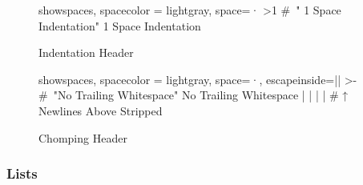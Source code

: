 \begin{figure}[H]
  \begin{minipage}[t]{0.48\textwidth}
    \vspace{0pt}
    \begin{bchart}[max=9, width=0.85\textwidth]
    \end{bchart}
  \end{minipage}
  \begin{minipage}[t]{0.48\textwidth}
    \vspace{0pt}
    \begin{yamlcode*}{showspaces, spacecolor = lightgray, space=·}
      >1 # "  1 Space Indentation"
         1 Space Indentation
    \end{yamlcode*}
  \end{minipage}
  \caption{Indentation Header}
\end{figure}

\begin{figure}[H]
  \begin{minipage}[t]{0.48\textwidth}
    \vspace{0pt}
    \begin{bchart}[max=9, width=0.85\textwidth]
    \end{bchart}
  \end{minipage}
  \begin{minipage}[t]{0.48\textwidth}
    \vspace{0pt}
    \begin{yamlcode*}{showspaces, spacecolor = lightgray, space=·, escapeinside=||}
      >- # "No Trailing Whitespace"
         No Trailing Whitespace
        | |
        | |
      # ↑ Newlines Above Stripped
    \end{yamlcode*}
  \end{minipage}
  \caption{Chomping Header}
\end{figure}

\subsubsection{Lists}

